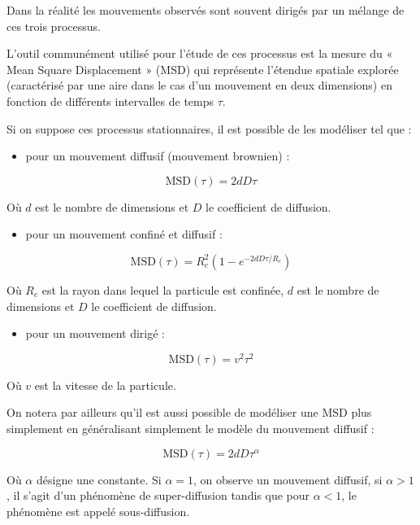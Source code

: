 \documentclass[12pt,a4paper,twoside,openright]{book}
\providecommand{\tightlist}{%
  \setlength{\itemsep}{0pt}\setlength{\parskip}{0pt}}
\begin{document}
Dans la réalité les mouvements observés sont souvent dirigés par un
mélange de ces trois processus.

L'outil communément utilisé pour l'étude de ces processus est la mesure
du « Mean Square Displacement » (MSD) qui représente l'étendue spatiale
explorée (caractérisé par une aire dans le cas d'un mouvement en deux
dimensions) en fonction de différents intervalles de temps \(\tau\).

Si on suppose ces processus stationnaires, il est possible de les
modéliser tel que :

\begin{itemize}
\tightlist
\item
  pour un mouvement diffusif (mouvement brownien) :
\end{itemize}

\[
\mbox{MSD}(\tau) = 2dD\tau
\]

Où \(d\) est le nombre de dimensions et \(D\) le coefficient de
diffusion.

\begin{itemize}
\tightlist
\item
  pour un mouvement confiné et diffusif :
\end{itemize}

\[
\mbox{MSD}(\tau) = R_c^2(1-e^{-2dD\tau / R_c})
\]

Où \(R_c\) est la rayon dans lequel la particule est confinée, \(d\) est
le nombre de dimensions et \(D\) le coefficient de diffusion.

\begin{itemize}
\tightlist
\item
  pour un mouvement dirigé :
\end{itemize}

\[
\mbox{MSD}(\tau) = v^2\tau ^2
\]

Où \(v\) est la vitesse de la particule.

On notera par ailleurs qu'il est aussi possible de modéliser une MSD
plus simplement en généralisant simplement le modèle du mouvement
diffusif :

\[
\mbox{MSD}(\tau) = 2dD\tau ^ {\alpha}
\]

Où \(\alpha\) désigne une constante. Si \(\alpha = 1\), on observe un
mouvement diffusif, si \(\alpha > 1\), il s'agit d'un phénomène de
super-diffusion tandis que pour \(\alpha < 1\), le phénomène est appelé
sous-diffusion.
\end{document}
